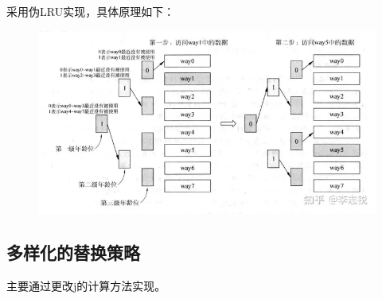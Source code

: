 \documentclass[12pt,a4paper]{ctexart}
\begin{document}
采用伪LRU实现，具体原理如下：
\begin{figure}[H]
    \centering
    \includegraphics[scale=0.6]{lru.png}
\end{figure}
\subsection{多样化的替换策略}
主要通过更改j的计算方法实现。
\end{document}
